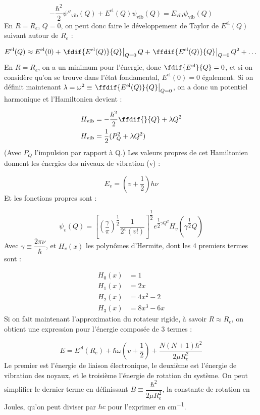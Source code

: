 \[ -\dfrac{\hbar^2}{2}\psi''_\text{vib}(Q) + E^\text{el}(Q)\psi_\text{vib}(Q) = E_\text{vib}\psi_\text{vib}(Q) \]
En $R = R_e$, $Q = 0$, on peut donc faire le développement de Taylor de $E^\text{el}(Q)$ suivant autour de $R_e$ :


\[
    E^\text{el}(Q) \approx E^\text{el}(0) + \left. \fdif{E^\text{el}(Q)}{Q}\right|_{Q = 0}Q + \left. \ffdif{E^\text{el}(Q)}{Q}\right|_{Q = 0}Q^2 + \dots
\]
En $R = R_e$, on a un minimum pour l'énergie, donc $\fdif{E^\text{el}}{Q} = 0$, et si on considère qu'on se trouve dans l'état fondamental, $E^\text{el}(0) = 0$ également. Si on définit maintenant $\lambda = \omega^2 \equiv \left. \ffdif{E^\text{el}(Q)}{Q}\right|_{Q = 0} $, on a donc un potentiel harmonique et l'Hamiltonien devient :


\begin{align*}
    H_\text{vib} &= -\dfrac{\hbar^2}{2}\ffdif{}{Q} +\lambda Q^2\\
    H_\text{vib} &= \dfrac{1}{2}(P^2_Q + \lambda Q^2)
\end{align*}
(Avec $P_Q$ l'impulsion par rapport à Q.) Les valeurs propres de cet Hamiltonien donnent les énergies des niveaux de vibration (v) :


\[ E_v = (v + \dfrac{1}{2})h\nu \]
Et les fonctions propres sont :


\[
    \psi_v(Q) = \left[(\dfrac{\gamma}{\pi})^{\dfrac{1}{2}}\dfrac{1}{2^v(v!)} \right]^{\dfrac{1}{2}}e^{\dfrac{1}{2}\gamma Q^2}H_v(\gamma^{\dfrac{1}{2}}Q)
\]
Avec $\gamma \equiv \dfrac{2\pi \nu}{\hbar}$, et $H_v(x)$ les polynômes d'Hermite, dont les 4 premiers termes sont :


\begin{align*}
    H_0(x) &= 1\\
    H_1(x) &= 2x\\
    H_2(x) &= 4x^2-2\\
    H_3(x) &= 8x^3-6x
\end{align*}
Si on fait maintenant l'approximation du rotateur rigide, à savoir $R\approx R_e$, on obtient une expression pour l'énergie composée de 3 termes :


\[ E = E^\text{el}(R_e) + \hbar\omega(v+\dfrac{1}{2}) + \dfrac{N(N+1)\hbar^2}{2\mu R_e^2} \]
Le premier est l'énergie de liaison électronique, le deuxième est l'énergie de vibration des noyaux, et le troisième l'énergie de rotation du système. On peut simplifier le dernier terme en définissant $B \equiv \dfrac{\hbar^2}{2\mu R_e^2}$, la constante de rotation en Joules, qu'on peut diviser par $hc$ pour l'exprimer en \si{cm^{-1}}.


